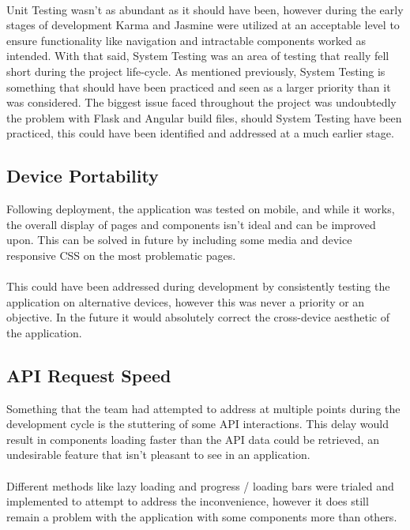 \paragraph{}
Unit Testing wasn't as abundant as it should have been, however during the early stages of development Karma and Jasmine were utilized at an acceptable level to ensure functionality like navigation and intractable components worked as intended. With that said, System Testing was an area of testing that really fell short during the project life-cycle. As mentioned previously, System Testing is something that should have been practiced and seen as a larger priority than it was considered. The biggest issue faced throughout the project was undoubtedly the problem with Flask and Angular build files, should System Testing have been practiced, this could have been identified and addressed at a much earlier stage.

\subsection{Device Portability}
Following deployment, the application was tested on mobile, and while it works, the overall display of pages and components isn't ideal and can be improved upon. This can be solved in future by including some media and device responsive CSS on the most problematic pages.

\paragraph{}
This could have been addressed during development by consistently testing the application on alternative devices, however this was never a priority or an objective. In the future it would absolutely correct the cross-device aesthetic of the application.

\subsection{API Request Speed}
Something that the team had attempted to address at multiple points during the development cycle is the stuttering of some API interactions. This delay would result in components loading faster than the API data could be retrieved, an undesirable feature that isn't pleasant to see in an application. 

\paragraph{}
Different methods like lazy loading and progress / loading bars were trialed and implemented to attempt to address the inconvenience, however it does still remain a problem with the application with some components more than others.


